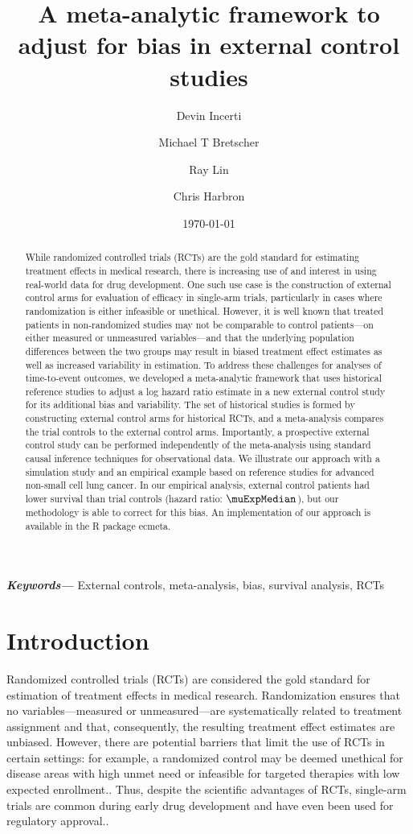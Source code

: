 \documentclass[11pt,final,fleqn]{article}\usepackage[]{graphicx}\usepackage[]{color}
\title{A meta-analytic framework to adjust for bias in external control studies}
\author[1]{Devin Incerti}
\author[2]{Michael T Bretscher}
\author[1]{Ray Lin}
\author[3]{Chris Harbron}
\affil[1]{Genentech, Inc, South San Francisco, CA, USA}
\affil[2]{F. Hoffmann-La Roche Ltd, Basel, Switzerland}
\affil[3]{Roche Products, Welwyn Garden City, UK}
\date{\today}
\newcommand{\pkg}[1]{{\fontseries{m}\fontseries{b}\selectfont #1}}
\providecommand{\keywords}[1]
{
  \small	
  \textbf{\textit{Keywords---}} #1
}
\begin{document}
\maketitle

\begin{abstract}

	While randomized controlled trials (RCTs) are the gold standard for estimating treatment effects in medical research, there is increasing use of and interest in using real-world data for drug development. One such use case is the construction of external control arms for evaluation of efficacy in single-arm trials, particularly in cases where randomization is either infeasible or unethical. However, it is well known that treated patients in non-randomized studies may not be comparable to control patients---on either measured or unmeasured variables---and that the underlying population differences between the two groups may result in biased treatment effect estimates as well as increased variability in estimation. To address these challenges for analyses of time-to-event outcomes, we developed a meta-analytic framework that uses historical reference studies to adjust a log hazard ratio estimate in a new external control study for its additional bias and variability. The set of historical studies is formed by constructing external control arms for historical RCTs, and a meta-analysis compares the trial controls to the external control arms. Importantly, a prospective external control study can be performed independently of the meta-analysis using standard causal inference techniques for observational data. We illustrate our approach with a simulation study and an empirical example based on reference studies for advanced non-small cell lung cancer. In our empirical analysis, external control patients had lower survival than trial controls (hazard ratio: $\muExpMedian$), but our methodology is able to correct for this bias. An implementation of our approach is available in the \textsf{R} package \pkg{ecmeta}. 

\end{abstract}


\keywords{External controls, meta-analysis, bias, survival analysis, RCTs}

\section{Introduction}
Randomized controlled trials (RCTs) are considered the gold standard for estimation of treatment effects in medical research. Randomization ensures that no variables---measured or unmeasured---are systematically related to treatment assignment and that, consequently, the resulting treatment effect estimates are unbiased. However, there are potential barriers that limit the use of RCTs in certain settings: for example, a randomized control may be deemed unethical for disease areas with high unmet need or infeasible for targeted therapies with low expected enrollment.\cite{black1996we, simon2015role}. Thus, despite the scientific advantages of RCTs, single-arm trials are common during early drug development \cite{sambucini2015comparison} and have even been used for regulatory approval.\cite{hatswell2016regulatory}. 
\end{document}
